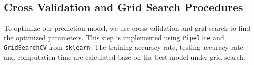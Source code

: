 \documentclass[11pt,a4paper]{article}
\begin{document}
    
    \subsection{Cross Validation and Grid Search Procedures}
    To optimize our prediction model, we use cross validation and grid search to find the optimized parameters. This step is implemented using \texttt{Pipeline} and \texttt{GridSearchCV} from \texttt{sklearn}. The training accuracy rate, testing accuracy rate and computation time are calculated base on the best model under grid search. \\









        
\end{document}
